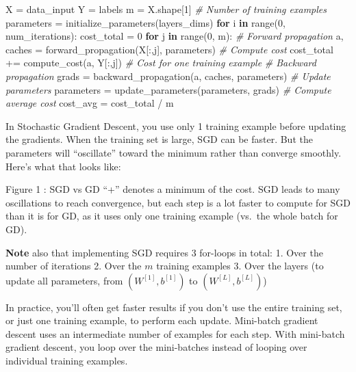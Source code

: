 \documentclass[11pt]{article}
\newenvironment{Shaded}{}{}
\newcommand{\KeywordTok}[1]{\textcolor[rgb]{0.00,0.44,0.13}{\textbf{{#1}}}}
\newcommand{\DecValTok}[1]{\textcolor[rgb]{0.25,0.63,0.44}{{#1}}}
\newcommand{\CommentTok}[1]{\textcolor[rgb]{0.38,0.63,0.69}{\textit{{#1}}}}
\newcommand{\NormalTok}[1]{{#1}}
\newcommand{\ControlFlowTok}[1]{\textcolor[rgb]{0.00,0.44,0.13}{\textbf{{#1}}}}
\newcommand{\OperatorTok}[1]{\textcolor[rgb]{0.40,0.40,0.40}{{#1}}}
\newcommand{\BuiltInTok}[1]{{#1}}
\begin{document}
\begin{Shaded}
\begin{Highlighting}[]
\NormalTok{X }\OperatorTok{=}\NormalTok{ data\_input}
\NormalTok{Y }\OperatorTok{=}\NormalTok{ labels}
\NormalTok{m }\OperatorTok{=}\NormalTok{ X.shape[}\DecValTok{1}\NormalTok{]  }\CommentTok{\# Number of training examples}
\NormalTok{parameters }\OperatorTok{=}\NormalTok{ initialize\_parameters(layers\_dims)}
\ControlFlowTok{for}\NormalTok{ i }\KeywordTok{in} \BuiltInTok{range}\NormalTok{(}\DecValTok{0}\NormalTok{, num\_iterations):}
\NormalTok{    cost\_total }\OperatorTok{=} \DecValTok{0}
    \ControlFlowTok{for}\NormalTok{ j }\KeywordTok{in} \BuiltInTok{range}\NormalTok{(}\DecValTok{0}\NormalTok{, m):}
        \CommentTok{\# Forward propagation}
\NormalTok{        a, caches }\OperatorTok{=}\NormalTok{ forward\_propagation(X[:,j], parameters)}
        \CommentTok{\# Compute cost}
\NormalTok{        cost\_total }\OperatorTok{+=}\NormalTok{ compute\_cost(a, Y[:,j])  }\CommentTok{\# Cost for one training example}
        \CommentTok{\# Backward propagation}
\NormalTok{        grads }\OperatorTok{=}\NormalTok{ backward\_propagation(a, caches, parameters)}
        \CommentTok{\# Update parameters}
\NormalTok{        parameters }\OperatorTok{=}\NormalTok{ update\_parameters(parameters, grads)}
    \CommentTok{\# Compute average cost}
\NormalTok{    cost\_avg }\OperatorTok{=}\NormalTok{ cost\_total }\OperatorTok{/}\NormalTok{ m}
\end{Highlighting}
\end{Shaded}

    In Stochastic Gradient Descent, you use only 1 training example before
updating the gradients. When the training set is large, SGD can be
faster. But the parameters will ``oscillate'' toward the minimum rather
than converge smoothly. Here's what that looks like:

Figure 1 : SGD vs GD ``+'' denotes a minimum of the cost. SGD leads to
many oscillations to reach convergence, but each step is a lot faster to
compute for SGD than it is for GD, as it uses only one training example
(vs.~the whole batch for GD).

\textbf{Note} also that implementing SGD requires 3 for-loops in total:
1. Over the number of iterations 2. Over the \(m\) training examples 3.
Over the layers (to update all parameters, from \((W^{[1]},b^{[1]})\) to
\((W^{[L]},b^{[L]})\))

In practice, you'll often get faster results if you don't use the entire
training set, or just one training example, to perform each update.
Mini-batch gradient descent uses an intermediate number of examples for
each step. With mini-batch gradient descent, you loop over the
mini-batches instead of looping over individual training examples.
\end{document}
